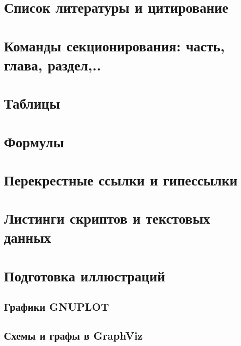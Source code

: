\section{Список литературы и цитирование}
\section{Команды секционирования: часть, глава, раздел,..}
\section{Таблицы}
\section{Формулы}
\section{Перекрестные ссылки и гипессылки}
\section{Листинги скриптов и текстовых данных}
\section{Подготовка иллюстраций}
\subsection{Графики GNUPLOT}
\subsection{Схемы и графы в GraphViz}
